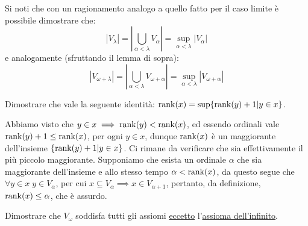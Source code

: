 \begin{remark}
	Si noti che con un ragionamento analogo a quello fatto per il caso limite \`e possibile dimostrare che:
	\[ |V_\lambda| = \left\lvert \bigcup_{\alpha < \lambda} V_\alpha\right\rvert = \sup_{\alpha < \lambda} |V_\alpha|
		\]
	e analogamente (sfruttando il lemma di sopra):
	\[ |V_{\omega + \lambda}| = \left\lvert \bigcup_{\alpha < \lambda} V_{\omega + \alpha}\right\rvert = \sup_{\alpha < \lambda} |V_{\omega + \alpha}|
		\]
\end{remark}

\begin{exercise}
	Dimostrare che vale la seguente identit\`a: $\operatorname{rank}(x) = \sup\{\operatorname{rank}(y) + 1 | y \in x\}$.
\end{exercise}

\begin{soln}
	Abbiamo visto che $y \in x \implies \operatorname{rank}(y) < \operatorname{rank} (x)$, ed essendo ordinali vale $\operatorname{rank}(y) + 1 \leq \operatorname{rank}(x)$, per ogni $y \in x$, dunque $\operatorname{rank}(x)$ \`e un maggiorante dell'insieme $\{\operatorname{rank}(y) + 1 | y \in x\}$. Ci rimane da verificare che sia effettivamente il pi\`u piccolo maggiorante.
	Supponiamo che esista un ordinale $\alpha$ che sia maggiorante dell'insieme e allo stesso tempo $\alpha < \operatorname{rank}(x)$, da questo segue che $\forall y \in x \; y \in V_\alpha$, per cui $x \subseteq V_\alpha \implies x \in V_{\alpha + 1}$, pertanto, da definizione, $\operatorname{rank}(x) \leq \alpha$, che \`e assurdo.
\end{soln}

\begin{exercise}[$V_\omega$]
	Dimostrare che $V_\omega$ soddisfa tutti gli assiomi \underline{eccetto} l'\hyperref[ax7]{assioma dell'infinito}.
\end{exercise}

